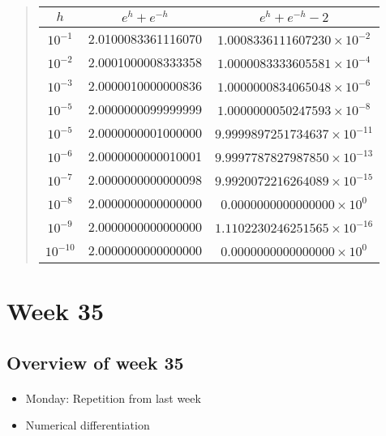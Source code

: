 \documentclass[%
oneside,                 %
final,                   %
10pt]{article}
\begin{document}
{{{{{{\begin{quote}
\begin{tabular}{ccc}
\hline
\multicolumn{1}{c}{ $h$ } & \multicolumn{1}{c}{ $e^{h}+e^{-h}$ } & \multicolumn{1}{c}{ $e^{h}+e^{-h}-2$ } \\
\hline
$10^{-1}$  & 2.0100083361116070 & $1.0008336111607230\times 10^{-2}$  \\
$10^{-2}$  & 2.0001000008333358 & $1.0000083333605581\times 10^{-4}$  \\
$10^{-3}$  & 2.0000010000000836 & $1.0000000834065048\times 10^{-6}$  \\
$10^{-5}$  & 2.0000000099999999 & $1.0000000050247593\times 10^{-8}$  \\
$10^{-5}$  & 2.0000000001000000 & $9.9999897251734637\times 10^{-11}$ \\
$10^{-6}$  & 2.0000000000010001 & $9.9997787827987850\times 10^{-13}$ \\
$10^{-7}$  & 2.0000000000000098 & $9.9920072216264089\times 10^{-15}$ \\
$10^{-8}$  & 2.0000000000000000 & $0.0000000000000000\times 10^{0}$   \\
$10^{-9}$  & 2.0000000000000000 & $1.1102230246251565\times 10^{-16}$ \\
$10^{-10}$ & 2.0000000000000000 & $0.0000000000000000\times 10^{0}$   \\
\hline
\end{tabular}
\end{quote}

\noindent




\section{Week 35}

\subsection{Overview of week 35}


\paragraph{}
\begin{itemize}
  \item Monday: Repetition from last week

  \item Numerical differentiation


\end{itemize}}}}}}}
\end{document}
